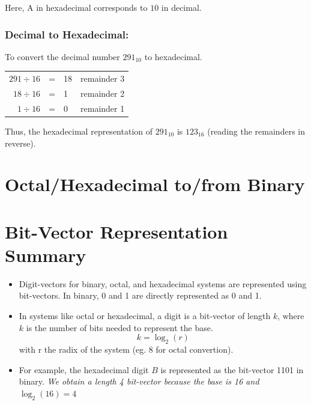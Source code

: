 \documentclass[12pt,openany, tikz,border=10pt]{book}
\begin{document}
    Here, \( \text{A} \) in hexadecimal corresponds to \( 10 \) in decimal.



    


    
    \subsubsection*{Decimal to Hexadecimal:}
  
    To convert the decimal number \(291_{10}\) to hexadecimal.
    
    \begin{tabular}{rclr}
    $291 \div 16$ & = & 18 & remainder 3 \\
    $18 \div 16$  & = & 1  & remainder 2 \\
    $1 \div 16$   & = & 0  & remainder 1 \\
    \end{tabular}
    
    \vspace*{10px}
    Thus, the hexadecimal representation of \(291_{10}\) is \(123_{16}\) (reading the remainders in reverse).
    


    \section{Octal/Hexadecimal to/from Binary}
    \section*{Bit-Vector Representation Summary}

    \begin{itemize}
      \item Digit-vectors for binary, octal, and hexadecimal systems are represented using bit-vectors. In binary, 0 and 1 are directly represented as 0 and 1.
      \item In systems like octal or hexadecimal, a digit is a bit-vector of length \( k \), where \( k \) is the number of bits needed to represent the base.$$k=\log_{2}(r)$$
      with r the radix of the system (eg. 8 for octal convertion).
      \item For example, the hexadecimal digit \( B \) is represented as the bit-vector 1101 in binary. \textit{We obtain a length 4 bit-vector because the base is 16 and \( \log_{2}(16) = 4 \)}
    \end{itemize}
\end{document}
